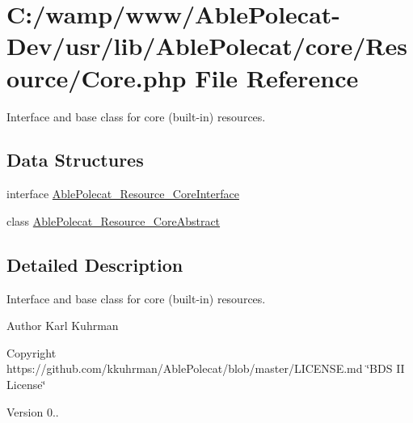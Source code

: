 \hypertarget{_core_8php}{}\section{C\+:/wamp/www/\+Able\+Polecat-\/\+Dev/usr/lib/\+Able\+Polecat/core/\+Resource/\+Core.php File Reference}
\label{_core_8php}


Interface and base class for core (built-\/in) resources.  


\subsection*{Data Structures}
\begin{DoxyCompactItemize}
\item 
interface \hyperlink{interface_able_polecat___resource___core_interface}{Able\+Polecat\+\_\+\+Resource\+\_\+\+Core\+Interface}
\item 
class \hyperlink{class_able_polecat___resource___core_abstract}{Able\+Polecat\+\_\+\+Resource\+\_\+\+Core\+Abstract}
\end{DoxyCompactItemize}


\subsection{Detailed Description}
Interface and base class for core (built-\/in) resources. 

\begin{DoxyAuthor}{Author}
Karl Kuhrman 
\end{DoxyAuthor}
\begin{DoxyCopyright}{Copyright}
https\+://github.com/kkuhrman/\+Able\+Polecat/blob/master/\+L\+I\+C\+E\+N\+S\+E.\+md \char`\"{}\+B\+D\+S I\+I License\char`\"{} 
\end{DoxyCopyright}
\begin{DoxyVersion}{Version}
0.. 
\end{DoxyVersion}
